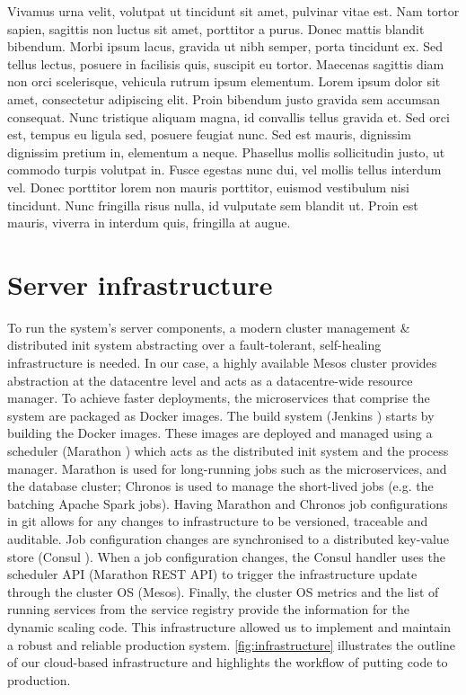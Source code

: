 \documentclass[a4paper, 10 pt, conference]{IEEEtran}
\begin{document}
Vivamus urna velit, volutpat ut tincidunt sit amet, pulvinar vitae est. Nam tortor sapien, sagittis non luctus sit amet, porttitor a purus. Donec mattis blandit bibendum. Morbi ipsum lacus, gravida ut nibh semper, porta tincidunt ex. Sed tellus lectus, posuere in facilisis quis, suscipit eu tortor. Maecenas sagittis diam non orci scelerisque, vehicula rutrum ipsum elementum. Lorem ipsum dolor sit amet, consectetur adipiscing elit. Proin bibendum justo gravida sem accumsan consequat. Nunc tristique aliquam magna, id convallis tellus gravida et. Sed orci est, tempus eu ligula sed, posuere feugiat nunc. Sed est mauris, dignissim dignissim pretium in, elementum a neque. Phasellus mollis sollicitudin justo, ut commodo turpis volutpat in. Fusce egestas nunc dui, vel mollis tellus interdum vel. Donec porttitor lorem non mauris porttitor, euismod vestibulum nisi tincidunt. Nunc fringilla risus nulla, id vulputate sem blandit ut. Proin est mauris, viverra in interdum quis, fringilla at augue.

\section{Server infrastructure}

To run the system's server components, a modern cluster management \& distributed init system abstracting over a fault-tolerant, self-healing infrastructure is needed. In our case, a highly available Mesos \cite{mesos} cluster provides abstraction at the datacentre level and acts as a datacentre-wide resource manager. To achieve faster deployments, the microservices that comprise the system are packaged as Docker \cite{docker} images. The build system (Jenkins \cite{jenkins}) starts by building the Docker images. These images are deployed and managed using a scheduler (Marathon \cite{marathon}) which acts as the distributed init system and the process manager. Marathon is used for long-running jobs such as the microservices, and the database cluster; Chronos \cite{chronos} is used to manage the short-lived jobs (e.g. the batching Apache Spark jobs). Having Marathon and Chronos job configurations in git allows for any changes to infrastructure to be versioned, traceable and auditable. Job configuration changes are synchronised to a distributed key-value store (Consul \cite{consul}). When a job configuration changes, the Consul handler uses the scheduler API (Marathon REST API) to trigger the infrastructure update through the cluster OS (Mesos). Finally, the cluster OS metrics and the list of running services from the service registry provide the information for the dynamic scaling code.
This infrastructure allowed us to implement and maintain a robust and reliable production system. \autoref{fig:infrastructure} illustrates the outline of our cloud-based infrastructure and highlights the workflow of putting code to production.
\end{document}
